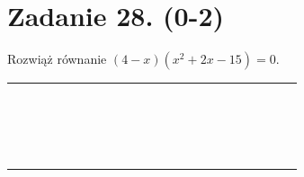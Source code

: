 \documentclass[10pt]{article}
\begin{document}
\section*{Zadanie 28. (0-2)}
Rozwiąż równanie \((4-x)\left(x^{2}+2 x-15\right)=0\).

\begin{center}
\begin{tabular}{|c|c|c|c|c|c|c|c|c|c|c|c|c|c|c|c|c|c|c|c|c|c|c|}
\hline
 &  &  &  &  &  &  &  &  &  &  &  &  &  &  &  &  &  &  &  &  &  &  \\
\hline
 &  &  &  &  &  &  &  &  &  &  &  &  &  &  &  &  &  &  &  &  &  &  \\
\hline
 &  &  &  &  &  &  &  &  &  &  &  &  &  &  &  &  &  &  &  &  &  &  \\
\hline
 &  &  &  &  &  &  &  &  &  &  &  &  &  &  &  &  &  &  &  &  &  &  \\
\hline
 &  &  &  &  &  &  &  &  &  &  &  &  &  &  &  &  &  &  &  &  &  &  \\
\hline
 &  &  &  &  &  &  &  &  &  &  &  &  &  &  &  &  &  &  &  &  &  &  \\
\hline
 &  &  &  &  &  &  &  &  &  &  &  &  &  &  &  &  &  &  &  &  &  &  \\
\hline
 &  &  &  &  &  &  &  &  &  &  &  &  &  &  &  &  &  &  &  &  &  &  \\
\hline
 &  &  &  &  &  &  &  &  &  &  &  &  &  &  &  &  &  &  &  &  &  &  \\
\hline
 &  &  &  &  &  &  &  &  &  &  &  &  &  &  &  &  &  &  &  &  &  &  \\
\hline
 &  &  &  &  &  &  &  &  &  &  &  &  &  &  &  &  &  &  &  &  &  &  \\
\hline
 &  &  &  &  &  &  &  &  &  &  &  &  &  &  &  &  &  &  &  &  &  &  \\
\hline
 &  &  &  &  &  &  &  &  &  &  &  &  &  &  &  &  &  &  &  &  &  &  \\
\hline
 &  &  &  &  &  &  &  &  &  &  &  &  &  &  &  &  &  &  &  &  &  &  \\
\hline
 &  &  &  &  &  &  &  &  &  &  &  &  &  &  &  &  &  &  &  &  &  &  \\
\hline
 &  &  &  &  &  &  &  &  &  &  &  &  &  &  &  &  &  &  &  &  &  &  \\
\hline
 &  &  &  &  &  &  &  &  &  &  &  &  &  &  &  &  &  &  &  &  &  &  \\
\hline
 &  &  &  &  &  &  &  &  &  &  &  &  &  &  &  &  &  &  &  &  &  &  \\
\hline
 &  &  &  &  &  &  &  &  &  &  &  &  &  &  &  &  &  &  &  &  &  &  \\

\end{tabular}
\end{center}
\end{document}
